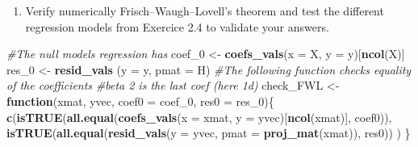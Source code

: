 \documentclass[]{book}
\newenvironment{Shaded}{\begin{snugshade}}{\end{snugshade}}
\newcommand{\CommentTok}[1]{\textcolor[rgb]{0.56,0.35,0.01}{\textit{#1}}}
\newcommand{\ControlFlowTok}[1]{\textcolor[rgb]{0.13,0.29,0.53}{\textbf{#1}}}
\newcommand{\DataTypeTok}[1]{\textcolor[rgb]{0.13,0.29,0.53}{#1}}
\newcommand{\DecValTok}[1]{\textcolor[rgb]{0.00,0.00,0.81}{#1}}
\newcommand{\KeywordTok}[1]{\textcolor[rgb]{0.13,0.29,0.53}{\textbf{#1}}}
\newcommand{\NormalTok}[1]{#1}
\newcommand{\StringTok}[1]{\textcolor[rgb]{0.31,0.60,0.02}{#1}}
\providecommand{\tightlist}{%
  \setlength{\itemsep}{0pt}\setlength{\parskip}{0pt}}
\theoremstyle{definition}
\theoremstyle{definition}
\theoremstyle{definition}
\theoremstyle{remark}
\begin{document}
\begin{enumerate}
\def\labelenumi{\alph{enumi}.}
\setcounter{enumi}{4}
\tightlist
\item
  Verify numerically Frisch--Waugh--Lovell's theorem and test the
  different regression models from Exercice 2.4 to validate your
  answers.
\end{enumerate}

\begin{Shaded}
\begin{Highlighting}[]
\CommentTok{#The null models regression has}
\NormalTok{coef_}\DecValTok{0}\NormalTok{ <-}\StringTok{ }\KeywordTok{coefs_vals}\NormalTok{(}\DataTypeTok{x =}\NormalTok{ X, }\DataTypeTok{y =}\NormalTok{ y)[}\KeywordTok{ncol}\NormalTok{(X)]}
\NormalTok{res_}\DecValTok{0}\NormalTok{  <-}\StringTok{ }\KeywordTok{resid_vals}\NormalTok{ (}\DataTypeTok{y =}\NormalTok{ y, }\DataTypeTok{pmat =}\NormalTok{ H)}
\CommentTok{#The following function checks equality of the coefficients}
\CommentTok{#beta 2 is the last coef (here 1d)}
\NormalTok{check_FWL <-}\StringTok{ }\ControlFlowTok{function}\NormalTok{(xmat, yvec, }\DataTypeTok{coef0 =}\NormalTok{ coef_}\DecValTok{0}\NormalTok{, }\DataTypeTok{res0 =}\NormalTok{ res_}\DecValTok{0}\NormalTok{)\{}
  \KeywordTok{c}\NormalTok{(}\KeywordTok{isTRUE}\NormalTok{(}\KeywordTok{all.equal}\NormalTok{(}\KeywordTok{coefs_vals}\NormalTok{(}\DataTypeTok{x =}\NormalTok{ xmat, }\DataTypeTok{y =}\NormalTok{ yvec)[}\KeywordTok{ncol}\NormalTok{(xmat)], coef0)),}
    \KeywordTok{isTRUE}\NormalTok{(}\KeywordTok{all.equal}\NormalTok{(}\KeywordTok{resid_vals}\NormalTok{(}\DataTypeTok{y =}\NormalTok{ yvec, }\DataTypeTok{pmat =} \KeywordTok{proj_mat}\NormalTok{(xmat)), res0))}
\NormalTok{  )}
\NormalTok{\}}


\end{Highlighting}
\end{Shaded}
\end{document}
